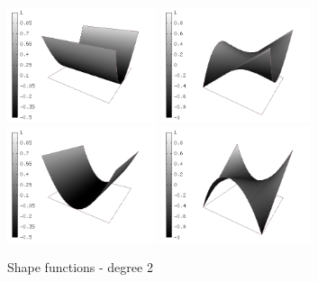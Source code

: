 \begin{figure}[H]
\begin{center}
\includegraphics[width=4.4cm]{minor_examples/BasisFunctions003}
\includegraphics[width=4.4cm]{minor_examples/BasisFunctions007}
\\
\includegraphics[width=4.4cm]{minor_examples/BasisFunctions009}
\includegraphics[width=4.4cm]{minor_examples/BasisFunctions010}
\end{center}
\caption{Shape functions - degree 2}
\vspace{-7mm}
\label{bubbleshape2q}
\end{figure}

